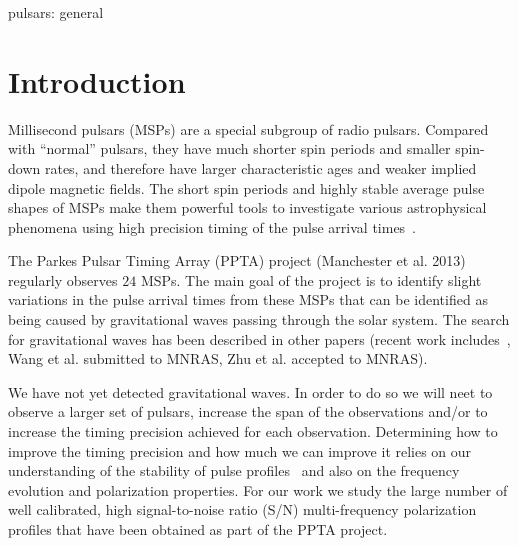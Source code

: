 \documentclass[useAMS,usenatbib]{mn2e}
\begin{document}
\begin{keywords}
%
pulsars: general
%
\end{keywords}


\section{Introduction}

Millisecond pulsars (MSPs) are a special subgroup of radio pulsars. 
%
Compared with ``normal'' pulsars, they have much shorter spin periods 
and smaller spin-down rates, and therefore have larger characteristic 
ages and weaker implied dipole magnetic fields.
%
The short spin periods and highly stable average pulse shapes of MSPs 
make them powerful tools to investigate various astrophysical phenomena 
using high precision timing of the pulse arrival times~\citep[e.g.,][]{Manchester08}.
%

The Parkes Pulsar Timing Array (PPTA) project (Manchester et al. 2013) 
regularly observes $24$ MSPs. The main goal of the project is to identify 
slight variations in the pulse arrival times from these MSPs that can be 
identified as being caused by gravitational waves passing through the solar 
system.  
%
The search for gravitational waves has been described in other papers (recent 
work includes~\citet{Shannon13b}, Wang et al. submitted to MNRAS, Zhu et al. 
accepted to MNRAS). 
%

We have not yet detected gravitational waves.  In order to do so we will neet 
to observe a larger set of pulsars, increase the span of the observations and/or 
to increase the timing precision achieved for each observation. 
%
%
%
Determining how to improve the timing precision and how much we can improve 
it relies on our understanding of the stability of pulse profiles~\citep[e.g.,][]{Shannon14} 
and also on the frequency evolution and polarization properties.
%
For our work we study the large number of well calibrated, high signal-to-noise 
ratio (S/N) multi-frequency polarization profiles that have been obtained as 
part of the PPTA project. 
%
\end{document}
